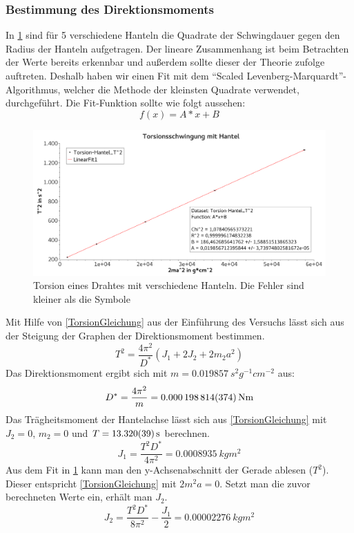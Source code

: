 \documentclass[
	a4paper,
	12pt,
	pagesize,
	ngerman
]{scrartcl}
\begin{document}
	\subsubsection*{Bestimmung des Direktionsmoments}
	In \cref{TorsionGraph} sind für 5 verschiedene Hanteln die Quadrate der Schwingdauer gegen den Radius der Hanteln aufgetragen. Der lineare Zusammenhang ist beim Betrachten der Werte bereits erkennbar und außerdem sollte dieser der Theorie zufolge auftreten. %
	Deshalb haben wir einen Fit mit dem \enquote{Scaled Levenberg-Marquardt}-Algorithmus, welcher die Methode der kleinsten Quadrate verwendet, durchgeführt. Die Fit-Funktion sollte wie folgt aussehen:
	\begin{equation}
		f(x)=A*x+B
	\end{equation}
	\begin{figure}[tb]
		\includegraphics[width=1\textwidth]{Torsion}
		\centering
		\caption{Torsion eines Drahtes mit verschiedene Hanteln. Die Fehler sind kleiner als die Symbole}
		\label{TorsionGraph}
		\centering
	\end{figure}
	Mit Hilfe von \cref{TorsionGleichung} aus der Einführung des Versuchs lässt sich aus der Steigung der Graphen der Direktionsmoment bestimmen.
	\begin{equation}
		\label{TorsionGleichung}
		T^2 = \frac{4\pi^2}{D^*} (J_1 + 2J_2 + 2m_2 a^2)
	\end{equation}
	Das Direktionsmoment ergibt sich mit $m=\SI{0,019857}{s^2g^{-1}cm^{-2}}$ aus:
	\begin{equation}
	D^* = \frac{4\pi^2}{m} = \SI{0,000198814\pm 0,000000374}{Nm} %
	\end{equation}
	Das Trägheitsmoment der Hantelachse lässt sich aus \cref{TorsionGleichung} mit $J_2=0$, $m_2=0$ und $T=\SI{13,32 \pm0,039}{s}$ berechnen.
	\begin{equation}
		J_1= \frac{T^2D^*}{4\pi^2} = \SI{0,0008935}{kgm^2}
	\end{equation}
	Aus dem Fit in \cref{TorsionGraph} kann man den y-Achsenabschnitt der Gerade ablesen ($T^2$). Dieser entspricht \cref{TorsionGleichung} mit $2m^2a=0$. Setzt man die zuvor berechneten Werte ein, erhält man $J_2$.
	\begin{equation}
		J_2 = \frac{T^2D^*}{8\pi^2} - \frac{J_1}{2} = \SI{0,00002276}{kgm^2}
	\end{equation}
\end{document}
